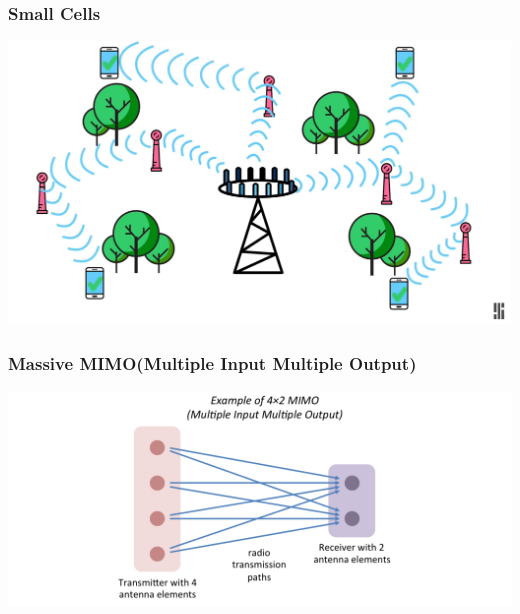 \documentclass{beamer}
\begin{document}
    \begin{frame}
        \frametitle{Small Cells}
        \includegraphics[width=\linewidth]{img/SmallCell2.png}
    \end{frame}

    \begin{frame}
        \frametitle{Massive MIMO(Multiple Input Multiple Output)}
        \includegraphics[width=\linewidth]{img/MIMO.png}
    \end{frame}
\end{document}

